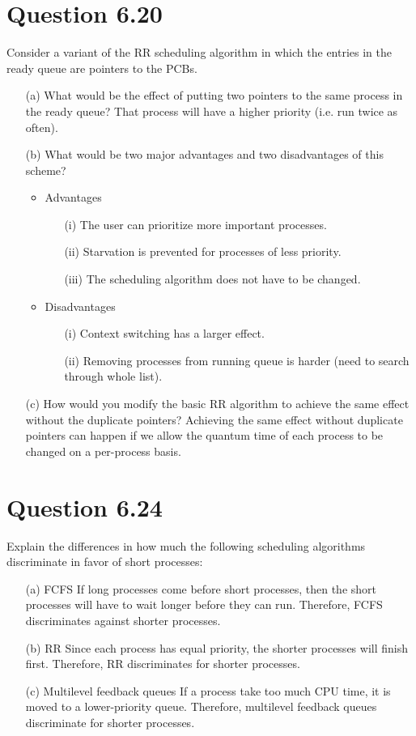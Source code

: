 \documentclass[12pt]{article}
\begin{document}
\section*{Question 6.20} {\color{blue}Consider a variant of the RR scheduling algorithm in which the entries in the ready queue are pointers to the PCBs.
\begin{enumerate}
\item[(a)]What would be the effect of putting two pointers to the same process in the ready queue? {\color{black} That process will have a higher priority (i.e. run twice as often). }
\item[(b)]What would be two major advantages and two disadvantages of this scheme?
{\color{black}
\begin{itemize}
\item Advantages
\begin{enumerate}
\item[(i)]The user can prioritize more important processes.
\item[(ii)]Starvation is prevented for processes of less priority.
\item[(iii)]The scheduling algorithm does not have to be changed.
\end{enumerate}
\item Disadvantages
\begin{enumerate}
\item[(i)]Context switching has a larger effect.
\item[(ii)]Removing processes from running queue is harder (need to search through whole list).
\end{enumerate}
\end{itemize}
}
\item[(c)]How would you modify the basic RR algorithm to achieve the same effect without the duplicate pointers? {\color{black} Achieving the same effect without duplicate pointers can happen if we allow the quantum time of each process to be changed on a per-process basis.}
\end{enumerate}
}

\section*{Question 6.24} {\color{blue}Explain the differences in how much the following scheduling algorithms discriminate in favor of short processes:
\begin{enumerate}
\item[(a)]FCFS {\color{black} If long processes come before short processes, then the short processes will have to wait longer before they can run. Therefore, FCFS discriminates against shorter processes.}
\item[(b)]RR {\color{black} Since each process has equal priority, the shorter processes will finish first. Therefore, RR discriminates for shorter processes. }
\item[(c)]Multilevel feedback queues {\color{black} If a process take too much CPU time, it is moved to a lower-priority queue. Therefore, multilevel feedback queues discriminate for shorter processes.}
\end{enumerate}
}
\end{document}

